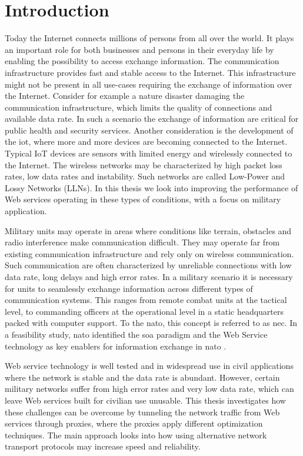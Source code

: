 
\chapter{Introduction}

Today the Internet connects millions of persons from all over the world. It
plays an important role for both businesses and persons in their everyday life
by enabling the possibility to access exchange information. The communication
infrastructure provides fast and stable access to the Internet. This
infrastructure might not be present in all use-cases requiring the exchange of
information over the Internet. Consider for example a nature disaster damaging
the communication infrastructure, which limits the quality of connections and
available data rate. In such a scenario the exchange of information are critical
for public health and security services. Another consideration is the
development of the \gls{iot}, where more and more devices are becoming connected
to the Internet. Typical IoT devices are sensors with limited energy and
wirelessly connected to the Internet. The wireless networks may be characterized
by high packet loss rates, low data rates and instability. Such networks are
called Low-Power and Lossy Networks (LLNs). In this thesis we look into
improving the performance of Web services operating in these types of
conditions, with a focus on military application.


Military units may operate in areas where conditions like terrain, obstacles and
radio interference make communication difficult. They may operate far from
existing communication infrastructure and rely only on wireless communication.
Such communication are often characterized by unreliable connections with low
data rate, long delays and high error rates. In a military scenario it is
necessary for units to seamlessly exchange information across different types of
communication systems. This ranges from remote combat units at the tactical
level, to commanding officers at the operational level in a static headquarters
packed with computer support. To the \gls{nato}, this concept is referred to as
\gls{nec}. In a feasibility study, \gls{nato} identified the \gls{soa} paradigm
and the Web Service technology as key enablers for information exchange in
\gls{nato} \cite{nnec-study}.

Web service technology is well tested and in widespread use in civil
applications where the network is stable and the data rate is abundant. However,
certain military networks suffer from high error rates and very low data rate,
which can leave Web services built for civilian use unusable. This thesis
investigates how these challenges can be overcome by tunneling the network
traffic from Web services through proxies, where the proxies apply different
optimization techniques. The main approach looks into how using alternative
network transport protocols may increase speed and reliability.

